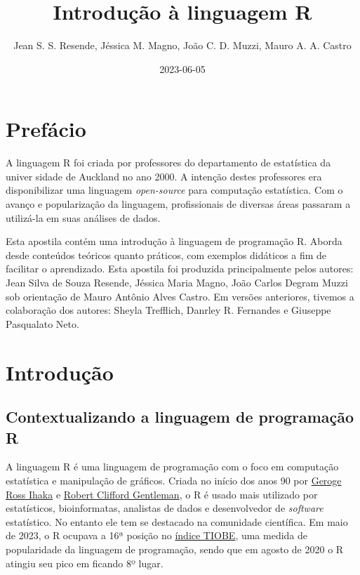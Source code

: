 \documentclass[
]{book}
\title{Introdução à linguagem R}
\author{Jean S. S. Resende, Jéssica M. Magno, João C. D. Muzzi, Mauro A. A. Castro}
\date{2023-06-05}
\begin{document}
\maketitle

{
\setcounter{tocdepth}{1}
\tableofcontents
}
\hypertarget{prefuxe1cio}{%
\chapter{Prefácio}\label{prefuxe1cio}}

A linguagem R foi criada por professores do departamento de estatística da univer sidade de Auckland no ano 2000. A intenção destes professores era disponibilizar uma linguagem \emph{open-source} para computação estatística. Com o avanço e popularização da linguagem, profissionais de diversas áreas passaram a utilizá-la em suas análises de dados.

Esta apostila contém uma introdução à linguagem de programação R. Aborda desde conteúdos teóricos quanto práticos, com exemplos didáticos a fim de facilitar o aprendizado. Esta apostila foi produzida principalmente pelos autores: Jean Silva de Souza Resende, Jéssica Maria Magno, João Carlos Degram Muzzi sob orientação de Mauro Antônio Alves Castro. Em versões anteriores, tivemos a colaboração dos autores: Sheyla Trefflich, Danrley R. Fernandes e Giuseppe Pasqualato Neto.

\hypertarget{introduuxe7uxe3o}{%
\chapter{Introdução}\label{introduuxe7uxe3o}}

\hypertarget{contextualizando-a-linguagem-de-programauxe7uxe3o-r}{%
\section{Contextualizando a linguagem de programação R}\label{contextualizando-a-linguagem-de-programauxe7uxe3o-r}}

A linguagem R é uma linguagem de programação com o foco em computação estatística e manipulação de gráficos. Criada no início dos anos 90 por \href{https://en.wikipedia.org/wiki/Ross_Ihaka}{Geroge Ross Ihaka} e \href{https://en.wikipedia.org/wiki/Robert_Gentleman_(statistician)}{Robert Clifford Gentleman}, o R é usado mais utilizado por estatísticos, bioinformatas, analistas de dados e desenvolvedor de \emph{software} estatístico. No entanto ele tem se destacado na comunidade científica. Em maio de 2023, o R ocupava a 16ª posição no \href{https://www.tiobe.com/tiobe-index/}{índice TIOBE}, uma medida de popularidade da linguagem de programação, sendo que em agosto de 2020 o R atingiu seu pico em ficando 8º lugar.
\end{document}
